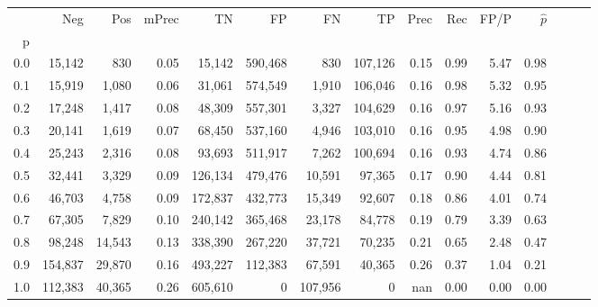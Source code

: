 \begin{tabular}{rrrrrrrrrrrrrrr}
\toprule
{} &      Neg &     Pos & mPrec &       TN &       FP &       FN &       TP &  Prec &   Rec &  FP/P & $\hat{p}$ \\
p   &          &         &       &          &          &          &          &       &       &       &           \\
\midrule
0.0 &   15,142 &     830 &  0.05 &   15,142 &  590,468 &      830 &  107,126 &  0.15 &  0.99 &  5.47 &      0.98 \\
0.1 &   15,919 &   1,080 &  0.06 &   31,061 &  574,549 &    1,910 &  106,046 &  0.16 &  0.98 &  5.32 &      0.95 \\
0.2 &   17,248 &   1,417 &  0.08 &   48,309 &  557,301 &    3,327 &  104,629 &  0.16 &  0.97 &  5.16 &      0.93 \\
0.3 &   20,141 &   1,619 &  0.07 &   68,450 &  537,160 &    4,946 &  103,010 &  0.16 &  0.95 &  4.98 &      0.90 \\
0.4 &   25,243 &   2,316 &  0.08 &   93,693 &  511,917 &    7,262 &  100,694 &  0.16 &  0.93 &  4.74 &      0.86 \\
0.5 &   32,441 &   3,329 &  0.09 &  126,134 &  479,476 &   10,591 &   97,365 &  0.17 &  0.90 &  4.44 &      0.81 \\
0.6 &   46,703 &   4,758 &  0.09 &  172,837 &  432,773 &   15,349 &   92,607 &  0.18 &  0.86 &  4.01 &      0.74 \\
0.7 &   67,305 &   7,829 &  0.10 &  240,142 &  365,468 &   23,178 &   84,778 &  0.19 &  0.79 &  3.39 &      0.63 \\
0.8 &   98,248 &  14,543 &  0.13 &  338,390 &  267,220 &   37,721 &   70,235 &  0.21 &  0.65 &  2.48 &      0.47 \\
0.9 &  154,837 &  29,870 &  0.16 &  493,227 &  112,383 &   67,591 &   40,365 &  0.26 &  0.37 &  1.04 &      0.21 \\
1.0 &  112,383 &  40,365 &  0.26 &  605,610 &        0 &  107,956 &        0 &   nan &  0.00 &  0.00 &      0.00 \\
\bottomrule
\end{tabular}
